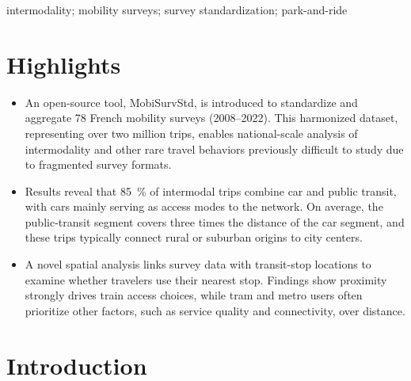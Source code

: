 \documentclass[3p,times,procedia]{elsarticle}
\begin{document}
\begin{frontmatter}
\begin{keyword}
    intermodality; mobility surveys; survey standardization; park-and-ride





\end{keyword}
\end{frontmatter}


\vspace{-2em}
\section*{Highlights}
\begin{itemize}
    \item An open-source tool, MobiSurvStd, is introduced to standardize and aggregate 78 French mobility surveys (2008–2022). This harmonized dataset, representing over two million trips, enables national-scale analysis of intermodality and other rare travel behaviors previously difficult to study due to fragmented survey formats.
    \item Results reveal that \SI{85}{\%} of intermodal trips combine car and public transit, with cars mainly serving as access modes to the network. On average, the public-transit segment covers three times the distance of the car segment, and these trips typically connect rural or suburban origins to city centers.
    \item A novel spatial analysis links survey data with transit-stop locations to examine whether travelers use their nearest stop. Findings show proximity strongly drives train access choices, while tram and metro users often prioritize other factors, such as service quality and connectivity, over distance.
\end{itemize}



\section{Introduction}
\label{sec:introduction}
\end{document}
